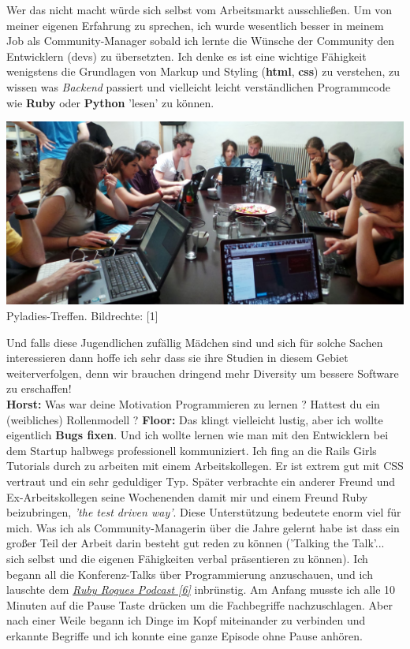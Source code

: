 \documentclass[10pt,a4paper,ngerman,twoside]{article} %
\begin{document}
\begin{multicols}{3}
Wer das nicht macht würde sich selbst vom Arbeitsmarkt ausschließen. Um von meiner eigenen Erfahrung zu sprechen, ich wurde wesentlich besser in meinem Job als Community-Manager sobald ich lernte die Wünsche der Community den Entwicklern (devs) zu übersetzten. Ich denke es ist eine  wichtige Fähigkeit wenigstens die Grundlagen von Markup und Styling (\textbf{html}, \textbf{css}) zu verstehen, zu wissen was \textit{Backend} passiert und vielleicht leicht verständlichen Programmcode wie \textbf{Ruby} oder \textbf{Python} 'lesen' zu können. 
\begin{center}
\includegraphics[width=\linewidth]{floor/floor5a.jpg} \\
\footnotesize{Pyladies-Treffen. Bildrechte: [1]} 
\end{center}
Und falls diese Jugendlichen zufällig Mädchen sind und sich für solche Sachen interessieren dann hoffe ich sehr dass sie ihre Studien in diesem Gebiet weiterverfolgen, denn wir brauchen dringend mehr Diversity um bessere Software zu erschaffen! \\
\textbf{Horst:} Was war deine Motivation Programmieren zu lernen ? Hattest du ein (weibliches) Rollenmodell ?
\textbf{Floor:} Das klingt vielleicht lustig, aber ich wollte eigentlich \textbf{Bugs fixen}. Und ich wollte lernen wie man mit den Entwicklern bei dem Startup halbwegs professionell kommuniziert. 
Ich fing an die Rails Girls Tutorials durch zu arbeiten mit einem Arbeitskollegen. Er ist extrem gut mit CSS vertraut und ein sehr geduldiger Typ. Später verbrachte ein anderer Freund und Ex-Arbeitskollegen seine Wochenenden damit mir und einem Freund Ruby beizubringen, \textit{'the test driven way'}. Diese Unterstützung bedeutete enorm viel für mich.
Was ich als Community-Managerin über die Jahre gelernt habe ist dass ein großer Teil der Arbeit darin besteht gut reden zu können ('Talking the Talk'... sich selbst und die eigenen Fähigkeiten verbal präsentieren zu können). Ich begann all die Konferenz-Talks über Programmierung anzuschauen, und ich lauschte dem \href{http://rubyrogues.com/}{\textit{Ruby Rogues Podcast [6]}} inbrünstig. Am Anfang musste ich alle 10 Minuten auf die Pause Taste drücken um die Fachbegriffe nachzuschlagen. Aber nach einer Weile begann ich Dinge im Kopf miteinander zu verbinden und erkannte Begriffe und ich konnte eine ganze Episode ohne Pause anhören. 

\end{multicols}
\end{document}
